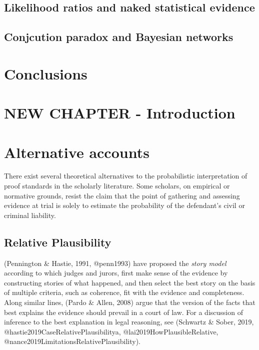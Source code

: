 \documentclass[10pt,dvipsnames]{scrartcl}
\begin{document}
\hypertarget{likelihood-ratios-and-naked-statistical-evidence}{%
\subsection{Likelihood ratios and naked statistical
evidence}\label{likelihood-ratios-and-naked-statistical-evidence}}

\hypertarget{conjcution-paradox-and-bayesian-networks}{%
\subsection{Conjcution paradox and Bayesian
networks}\label{conjcution-paradox-and-bayesian-networks}}

\hypertarget{conclusions}{%
\section{Conclusions}\label{conclusions}}

\hypertarget{new-chapter---introduction}{%
\section{NEW CHAPTER - Introduction}\label{new-chapter---introduction}}

\hypertarget{alternative-accounts}{%
\section{Alternative accounts}\label{alternative-accounts}}

There exist several theoretical alternatives to the probabilistic
interpretation of proof standards in the scholarly literature. Some
scholars, on empirical or normative grounds, resist the claim that the
point of gathering and assessing evidence at trial is solely to estimate
the probability of the defendant's civil or criminal liability.

\hypertarget{relative-plausibility}{%
\subsection{Relative Plausibility}\label{relative-plausibility}}

(Pennington \& Hastie, 1991, @penn1993) have proposed the
\textit{story model} according to which judges and jurors, first make
sense of the evidence by constructing stories of what happened, and then
select the best story on the basis of multiple criteria, such as
coherence, fit with the evidence and completeness. Along similar lines,
(Pardo \& Allen, 2008) argue that the version of the facts that best
explains the evidence should prevail in a court of law. For a discussion
of inference to the best explanation in legal reasoning, see (Schwartz
\& Sober, 2019, @hastie2019CaseRelativePlausibilitya,
@lai2019HowPlausibleRelative,
@nance2019LimitationsRelativePlausibility).
\end{document}

